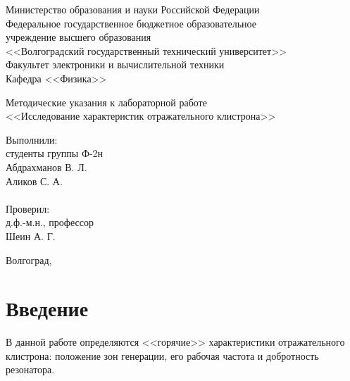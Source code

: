 \documentclass[a4paper,14pt]{extarticle}
\begin{document}
	\begin{titlepage}
        \begin{center}
          Министерство образования и науки Российской Федерации \\
          Федеральное государственное бюджетное образовательное \\
          учреждение высшего образования \\
          <<Волгоградский государственный технический университет>> \\
          Факультет электроники и вычислительной техники\\
          Кафедра <<Физика>>
        \end{center}
        \vspace{9em}
        \begin{center}
          \large
            Методические указания к лабораторной работе\\
            <<Исследование характеристик отражательного клистрона>>
        \end{center}
        \vspace{5em}
        \begin{flushright}
          \begin{minipage}{.40\textwidth}
            Выполнили:\\
            студенты группы Ф-2н\\
            Абдрахманов В. Л.\\
            Аликов С. А.\\
            \vspace{1em}\\
            Проверил:\\
            д.ф.-м.н., профессор\\
            Шеин А. Г.
          \end{minipage}
        \end{flushright}
        \vspace{\fill}
        \begin{center}
          Волгоград, \the\year
        \end{center}
    \end{titlepage}
    \setcounter{page}{2}

	\section*{Введение}
	В данной работе определяются <<горячие>> характеристики отражательного клистрона: положение зон генерации, его рабочая частота и добротность резонатора.
	
\end{document}
